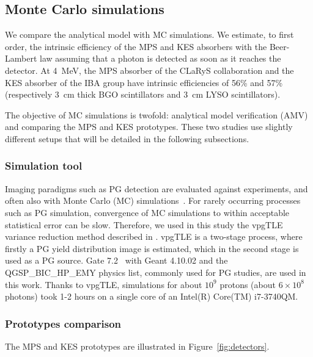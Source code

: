 \documentclass[a4paper,english,12pt]{article}
\begin{document}

\subsection{Monte Carlo simulations}
\label{sec:MC}

We compare the analytical model with MC simulations. We estimate, to first order, the intrinsic efficiency of the MPS and KES absorbers with the Beer-Lambert law assuming that a photon is detected as soon as it reaches the detector. At 4~MeV, the MPS absorber of the CLaRyS collaboration and the KES absorber of the IBA group have intrinsic efficiencies of 56\% and 57\% (respectively 3~cm thick BGO scintillators and 3~cm LYSO scintillators).

The objective of MC simulations is twofold: analytical model verification (AMV) and comparing the MPS and KES prototypes. These two studies use slightly different setups that will be detailed in the following subsections.

\subsubsection{Simulation tool}\label{sec:SimTool}

Imaging paradigms such as PG detection are evaluated against experiments, and often also with Monte Carlo (MC) simulations~\citep{Moteabbed2011,Gueth2013,Robert2013,Golnik2014a,Janssen2014}.
For rarely occurring processes such as PG simulation, convergence of MC simulations to within acceptable statistical error can be slow. Therefore, we used in this study the vpgTLE variance reduction method described in \cite{Huisman2016}. vpgTLE is a two-stage process, where firstly a PG yield distribution image is estimated, which in the second stage is used as a PG source. Gate 7.2~\citep{Sarrut2014} with Geant 4.10.02 and the QGSP\_BIC\_HP\_EMY physics list, commonly used for PG studies, are used in this work. Thanks to vpgTLE, simulations for about $10^9$ protons (about $6\times10^8$ photons) took 1-2 hours on a single core of an Intel(R) Core(TM) i7-3740QM.

\subsubsection{Prototypes comparison}\label{sec:camera} %

The MPS and KES prototypes are illustrated in Figure~\ref{fig:detectors}.
\end{document}
